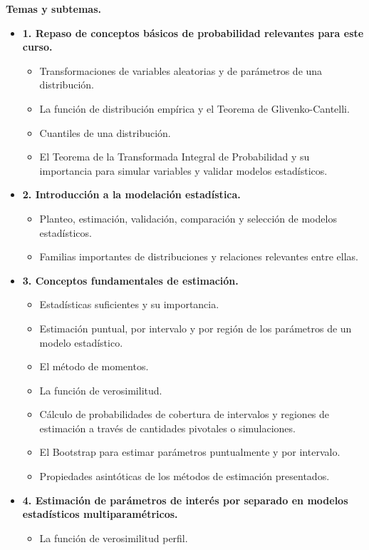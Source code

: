 \documentclass[10pt,a4paper]{article}
\begin{document}
\textbf{Temas y subtemas.}
\begin{itemize}
    \item \textbf{1. Repaso de conceptos básicos de probabilidad relevantes para este curso.}
    \begin{itemize}
        \item Transformaciones de variables aleatorias y de parámetros de una distribución.
        \item La función de distribución empírica y el Teorema de Glivenko-Cantelli.
        \item Cuantiles de una distribución.
        \item El Teorema de la Transformada Integral de Probabilidad y su importancia para simular variables y validar modelos estadísticos.
    \end{itemize}

    \item \textbf{2. Introducción a la modelación estadística.}
    \begin{itemize}
        \item Planteo, estimación, validación, comparación y selección de modelos estadísticos.
        \item Familias importantes de distribuciones y relaciones relevantes entre ellas.
    \end{itemize}

    \item \textbf{3. Conceptos fundamentales de estimación.}
    \begin{itemize}
        \item Estadísticas suficientes y su importancia.
        \item Estimación puntual, por intervalo y por región de los parámetros de un modelo estadístico.
        \item El método de momentos.
        \item La función de verosimilitud.
        \item Cálculo de probabilidades de cobertura de intervalos y regiones de estimación a través de cantidades pivotales o simulaciones.
        \item El Bootstrap para estimar parámetros puntualmente y por intervalo.
        \item Propiedades asintóticas de los métodos de estimación presentados.
    \end{itemize}

    \item \textbf{4. Estimación de parámetros de interés por separado en modelos estadísticos multiparamétricos.}
    \begin{itemize}
        \item La función de verosimilitud perfil.
    \end{itemize}


\end{itemize}
\end{document}
